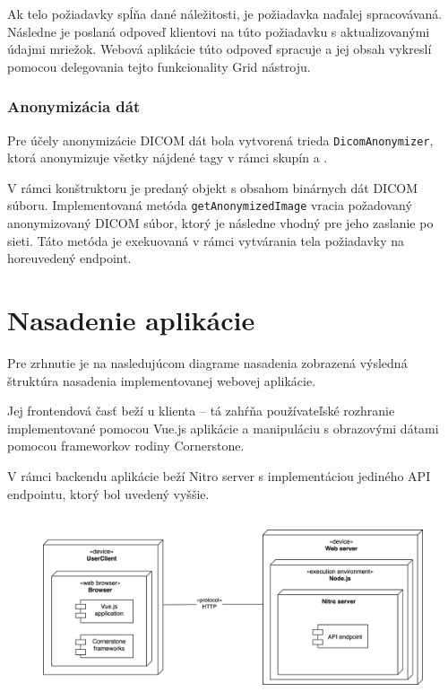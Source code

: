 Ak telo požiadavky spĺňa dané náležitosti, je požiadavka naďalej spracovávaná. Následne je poslaná odpoveď klientovi na túto požiadavku s aktualizovanými údajmi mriežok. Webová aplikácie túto odpoveď spracuje a jej obsah vykreslí pomocou delegovania tejto funkcionality Grid nástroju.

\subsubsection {Anonymizácia dát}
Pre účely anonymizácie DICOM dát bola vytvorená trieda \texttt{DicomAnonymizer}, ktorá anonymizuje všetky nájdené tagy v rámci skupín  a .

\clearpage

V rámci konštruktoru je predaný objekt s obsahom binárnych dát DICOM súboru. Implementovaná metóda \texttt{getAnonymizedImage} vracia požadovaný anonymizovaný DICOM súbor, ktorý je následne vhodný pre jeho zaslanie po sieti. Táto metóda je exekuovaná v rámci vytvárania tela požiadavky na horeuvedený endpoint.

\section {Nasadenie aplikácie}
Pre zrhnutie je na nasledujúcom diagrame nasadenia zobrazená výsledná štruktúra nasadenia implementovanej webovej aplikácie.

Jej frontendová časť beží u klienta -- tá zahŕňa používateľské rozhranie implementované pomocou Vue.js aplikácie a manipuláciu s obrazovými dátami pomocou frameworkov rodiny Cornerstone.

V rámci backendu aplikácie beží Nitro server s implementáciou jediného API endpointu, ktorý bol uvedený vyššie.

\begin {figure}[H]
        \centering
        \includegraphics[height=5.4cm]{media/graphs/deployment_diagram.png}
        \captionsetup{justification=centering}
\end {figure}

